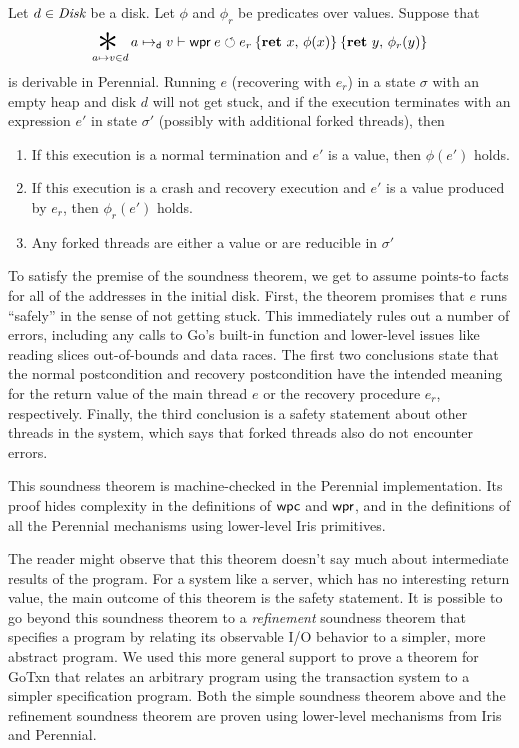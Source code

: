 \begin{theorem}
\label{thm:soundness}
  Let $d \in \textit{Disk}$ be a disk. Let $\phi$ and $\phi_r$ be predicates over
  values.
  Suppose that
  \[\bigast\limits_{a \mapsto v \in d} a \dmapsto v \proves
  \wpr{e}{e_r}{\Ret{x} \phi(x)}{\Ret{y} \phi_{r}(y)} \] is derivable in
  Perennial. Running $e$ (recovering with $e_{r}$) in a state $\sigma$ with an
  empty heap and disk $d$ will not get stuck, and if the execution
  terminates with an expression $e'$ in state $\sigma'$ (possibly
  with additional forked threads), then
  \begin{enumerate}
    \item If this execution is a normal termination and $e'$ is a value, then
    $\phi(e')$ holds.
    \item If this execution is a crash and recovery execution and $e'$ is a
    value produced by $e_{r}$, then
    $\phi_{r}(e')$ holds.
    \item Any forked threads are either a value or are reducible in $\sigma'$
  \end{enumerate}
\end{theorem}
To satisfy the premise of the soundness theorem, we get to assume points-to
facts for all of the addresses in the initial disk. First, the theorem promises
that $e$ runs ``safely'' in the sense of not getting stuck. This immediately
rules out a number of errors, including any calls to Go's built-in 
function and lower-level issues like reading slices out-of-bounds and data
races.  The first two conclusions state that the normal postcondition and
recovery postcondition have the intended meaning for the return value of the
main thread $e$ or the recovery procedure $e_{r}$, respectively. Finally, the
third conclusion is a safety statement about other threads in the system, which
says that forked threads also do not encounter errors.

This soundness theorem is machine-checked in the Perennial implementation. Its
proof hides complexity in the definitions of $\textsf{\upshape wpc}$ and $\textsf{\upshape wpr}$, and in the
definitions of all the Perennial mechanisms using lower-level Iris primitives.

The reader might observe that this theorem doesn't say much about intermediate
results of the program. For a system like a server, which has no interesting
return value, the main outcome of this theorem is the safety statement.
It is possible to go beyond this soundness theorem to a \emph{refinement}
soundness theorem that specifies a program by relating its observable I/O
behavior to a simpler, more abstract program. We used this more general support
to prove a theorem for GoTxn that relates an arbitrary program using the
transaction system to a simpler specification program. Both the simple soundness
theorem above and the refinement soundness theorem are proven using lower-level
mechanisms from Iris and Perennial.

